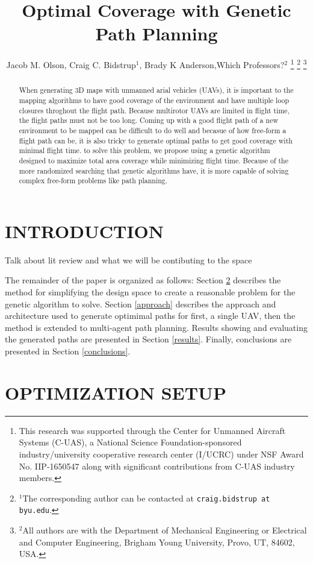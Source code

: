 \documentclass[letterpaper, 10 pt, conference]{ieeeconf}  %
\title{\LARGE \bf
Optimal Coverage with Genetic Path Planning
}
\author{Jacob M. Olson, Craig C. Bidstrup$^{1}$, Brady K Anderson,Which Professors?$^{2}$%
\thanks{This research was supported through the Center for Unmanned Aircraft Systems (C-UAS), a National Science Foundation-sponsored industry/university
cooperative research center (I/UCRC) under NSF Award No. IIP-1650547
along with significant contributions from C-UAS industry members.}%
\thanks{$^{1}$The corresponding author can be contacted at
        {\tt\small craig.bidstrup at byu.edu}.}%
\thanks{$^{2}$All authors are with the Department of Mechanical Engineering or Electrical and Computer Engineering,
        Brigham Young University, Provo, UT, 84602, USA.}%
}
\begin{document}
\maketitle
\thispagestyle{empty}
\pagestyle{empty}


\begin{abstract}

When generating 3D maps with unmanned arial vehicles (UAVs), it is important to the mapping algorithms to have good coverage of the environment and have multiple loop closures throghout the flight path. Because multirotor UAVs are limited in flight time, the flight paths must not be too long. Coming up with a good flight path of a new environment to be mapped can be difficult to do well and becasue of how free-form a flight path can be, it is also tricky to generate optimal paths to get good coverage with minimal flight time.
to solve this problem, we propose using a genetic algorithm designed to maximize total area coverage while minimizing flight time. Because of the more randomized searching that genetic algorithms have, it is more capable of solving complex free-form problems like path planning.

\end{abstract}


\section{INTRODUCTION}

Talk about lit review and what we will be contibuting to the space

The remainder of the paper is organized as follows: Section \ref{setup} describes the method for simplifying the design space to create a reasonable problem for the genetic algorithm to solve. Section \ref{approach} describes the approach and architecture used to generate optimimal paths for first, a single UAV, then the method is extended to multi-agent path planning. Results showing and evaluating the generated paths are presented in Section \ref{results}. Finally, conclusions are presented in Section \ref{conclusions}.

\section{OPTIMIZATION SETUP}\label{setup}
\end{document}
